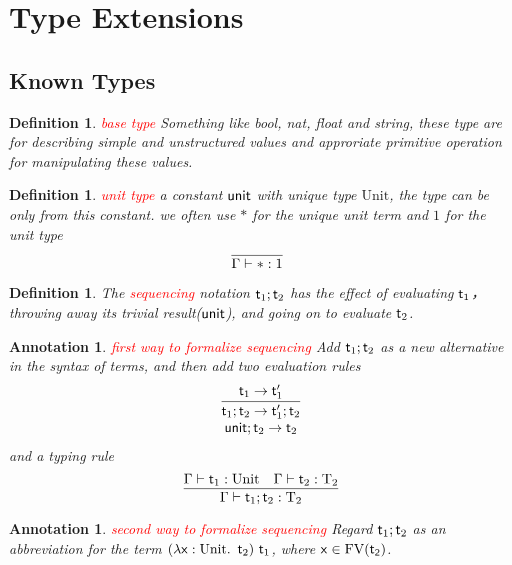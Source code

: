 \documentclass{article}
\theoremstyle{plain}
\newtheorem{definition}[theorem]{Definition}
\newtheorem{annotation}[theorem]{Annotation}
\theoremstyle{nonumberplain}
\newcommand{\lam}[2]{\ensuremath{\lambda #1\ldotp~ #2}} %
\newcommand{\singletype}[1]{\text{#1}}
\newcommand{\termtype}[2]{\ensuremath{#1:#2}}
\newcommand{\term}[1]{\ensuremath\mathsf{#1}}
\newcommand{\seq}[2]{#1;#2}
\newcommand{\redt}[1]{\textcolor{red}{#1}}
\begin{document}
\section{Type Extensions}

\subsection{Known Types}

\begin{definition}
\rm \redt{base type} Something like bool, nat, float and string, these type are for describing simple and unstructured values and approriate primitive operation for manipulating these values.
\end{definition}

\begin{definition}
\rm \redt{unit type} a constant $\term{unit}$ with unique type $\singletype{Unit}$, the type can be only from this constant. we often use $*$ for the unique unit term and $1$ for the unit type
$$
\infer[]{\Gamma \vdash *:1}{}
$$
\end{definition}

\begin{definition}
\rm The \redt{sequencing} notation $\seq{\term{t}_1}{\term{t}_2}$ has the effect of evaluating $\term{t}_1$，throwing away its trivial result($\term{unit}$), and going on to evaluate $\term{t}_2$. 
\end{definition}

\begin{annotation}
\rm \redt{ first way to formalize sequencing} Add $\seq{\term{t}_1}{\term{t}_2}$ as a new alternative in the syntax of terms, and then add two evaluation rules
$$
\begin{array}{cc}
\infer{\seq{\term{t}_1}{\term{t}_2} \to \seq{\term{t}_1'}{\term{t}_2}}{\term{t}_1 \to \term{t}_1'} \\
\seq{\term{unit}}{\term{t}_2} \to \term{t}_2 
\end{array}
$$
and a typing rule
$$
\infer{\Gamma \vdash \termtype{\seq{\term{t}_1}{\term{t}_2}}{\singletype{T}_2}}{\Gamma \vdash \termtype{\term{t}_1}{\singletype{Unit}} & \Gamma \vdash \termtype{\term{t}_2}{\singletype{T}_2}}
$$
\end{annotation}

\begin{annotation}
\rm \redt{ second way to formalize sequencing} Regard $\seq{\term{t}_1}{\term{t}_2}$ as an abbreviation for the term $(\lam{\termtype{\term{x}}{\singletype{Unit}}}{\term{t}_2})~\term{t}_1$, where $\term{x} \in \text{FV}(\term{t_2})$. 
\end{annotation}
\end{document}
